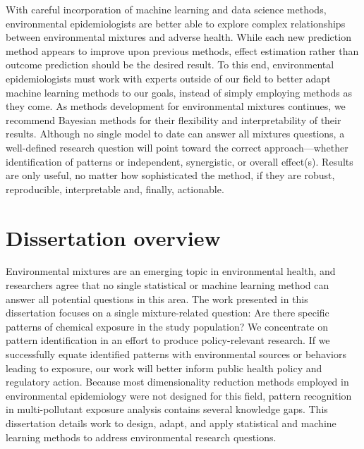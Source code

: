 With careful incorporation of machine learning and data science methods, environmental epidemiologists are better able to explore complex relationships between environmental mixtures and adverse health. While each new prediction method appears to improve upon previous methods, effect estimation rather than outcome prediction should be the desired result. To this end, environmental epidemiologists must work with experts outside of our field to better adapt machine learning methods to our goals, instead of simply employing methods as they come. As methods development for environmental mixtures continues, we recommend Bayesian methods for their flexibility and interpretability of their results. Although no single model to date can answer all mixtures questions, a well-defined research question will point toward the correct approach---whether identification of patterns or independent, synergistic, or overall effect(s). Results are only useful, no matter how sophisticated the method, if they are robust, reproducible, interpretable and, finally, actionable.\footnotemark


\section{Dissertation overview}\label{sec:diss_over}

Environmental mixtures are an emerging topic in environmental health, and researchers agree that no single statistical or machine learning method can answer all potential questions in this area. The work presented in this dissertation focuses on a single mixture-related question: Are there specific patterns of chemical exposure in the study population? We concentrate on pattern identification in an effort to produce policy-relevant research. If we successfully equate identified patterns with environmental sources or behaviors leading to exposure, our work will better inform public health policy and regulatory action. Because most dimensionality reduction methods employed in environmental epidemiology were not designed for this field, pattern recognition in  multi-pollutant exposure analysis contains several knowledge gaps. This dissertation details work to design, adapt, and apply statistical and machine learning methods to address environmental research questions.

